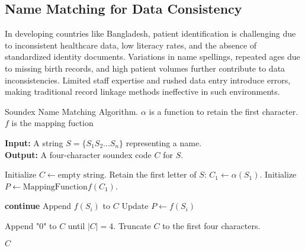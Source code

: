 










\subsection{Name Matching for Data Consistency}

In developing countries like Bangladesh, patient identification is challenging due to inconsistent healthcare data, low literacy rates, and the absence of standardized identity documents. Variations in name spellings, repeated ages due to missing birth records, and high patient volumes further contribute to data inconsistencies. Limited staff expertise and rushed data entry introduce errors, making traditional record linkage methods ineffective in such environments.


\begin{algorithm}
\caption{Soundex Name Matching Algorithm. $\alpha$ is a function to retain the first character. $f$ is the mapping fuction}
\textbf{Input:} A string $S=\{S_1S_2...S_n\}$ representing a name.\\
\textbf{Output:} A four-character soundex code $C$ for $S$.

\begin{algorithmic}[1]
\label{alg:soundex}
\STATE Initialize $C \gets \text{empty string}$.
\STATE Retain the first letter of $S$: $C_1 \gets \alpha(S_1)$.
\STATE Initialize $P \gets \text{MappingFunction} f(C_1)$.

    \STATE \textbf{continue}
    \STATE Append $f(S_i)$ to $C$
    \STATE Update $P \gets f(S_i)$
  \ENDIF
\ENDFOR

    \STATE Append "0" to $C$ until $|C| = 4$.
    \STATE Truncate $C$ to the first four characters.
\ENDIF

 $C$
\end{algorithmic}
\end{algorithm}
\vspace{-3mm}

